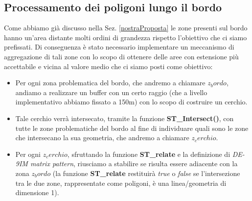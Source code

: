 \subsection{Processamento dei poligoni lungo il bordo}
Come abbiamo già discusso nella Sez. \ref{nostraProposta} le zone presenti sul bordo hanno un'area distante molti ordini di grandezza rispetto l'obiettivo che ci siamo prefissati. Di conseguenza è stato necessario implementare un meccanismo di aggregazione di tali zone con lo scopo di ottenere delle aree con estensione più accettabile e vicina al valore medio che ci siamo posti come obiettivo: \newline
\begin{itemize}
\item Per ogni zona problematica del bordo, che andremo a chiamare $z_bordo$, andiamo a realizzare un buffer con un certo raggio (che a livello implementativo abbiamo fissato a 150m) con lo scopo di costruire un cerchio.
\item Tale cerchio verrà intersecato, tramite la funzione \textbf{ST\_Intersect()}, con tutte le zone problematiche del bordo al fine di individuare quali sono le zone che intersecano la sua geometria, che andremo a chiamare $z_cerchio$.
\item Per ogni $z_cerchio$, sfruttando la funzione \textbf{ST\_relate} e la definizione di \textit{DE-9IM matrix pattern}, riusciamo a stabilire se risulta essere adiacente con la zona $z_bordo$ (la funzione \textbf{ST\_relate} restituirà \textit{true} o \textit{false} se l'intersezione tra le due zone, rappresentate come poligoni, è una linea/geometria di dimensione 1).

\end{itemize}



